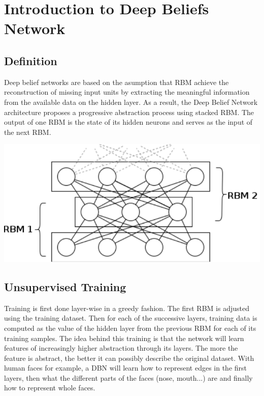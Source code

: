 \documentclass{report}
\begin{document}
	\section{Introduction to Deep Beliefs Network}
	
	\subsection{Definition}
	
	Deep belief networks are based on the asumption that RBM achieve the 
	reconstruction of missing input units by extracting the meaningful information 
	from the available data on the hidden layer. As a result, the Deep Belief 
	Network architecture  proposes a progressive abstraction process using stacked 
	RBM. The output of one RBM is the state of its hidden neurons and serves as the 
	input of the next RBM.
	
	\vspace{1cm}
	\begin{center}
		\includegraphics[scale=0.4]{ressources/dbn}
		\vspace{0.5cm}
	\end{center}
	\vspace{0.5cm}
	
	\subsection{Unsupervised Training}
	
	Training is first done layer-wise in a greedy fashion. The first RBM is 
	adjusted using the training dataset. Then for each of the successive layers, 
	training data is computed as the value of the hidden layer from the previous 
	RBM for each of its training samples. The idea behind this training is that the 
	network will learn features of increasingly higher abstraction through its 
	layers. The more the feature is abstract, the better it can possibly describe
	the original dataset. With human faces for example, a DBN will learn how to 
	represent edges in the first layers, then what the different parts of the 
	faces (nose, mouth...) are and finally how to represent whole faces.
	
\end{document}
